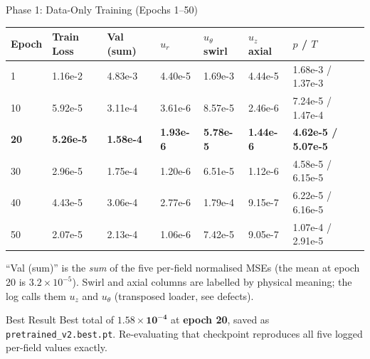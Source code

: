 \documentclass[aspectratio=169]{beamer}
\begin{document}
\begin{frame}{Phase 1: Data-Only Training (Epochs 1--50)}
\begin{table}
\centering
\footnotesize
\begin{tabular}{lllllll}
\toprule
Epoch & Train Loss & Val (sum) & $u_r$ & $u_\theta$ swirl & $u_z$ axial & $p$ / $T$ \\
\midrule
1 & 1.16e-2 & 4.83e-3 & 4.40e-5 & 1.69e-3 & 4.44e-5 & 1.68e-3 / 1.37e-3 \\
10 & 5.92e-5 & 3.11e-4 & 3.61e-6 & 8.57e-5 & 2.46e-6 & 7.24e-5 / 1.47e-4 \\
\textbf{20} & \textbf{5.26e-5} & \textbf{1.58e-4} & \textbf{1.93e-6} & \textbf{5.78e-5} & \textbf{1.44e-6} & \textbf{4.62e-5 / 5.07e-5} \\
30 & 2.96e-5 & 1.75e-4 & 1.20e-6 & 6.51e-5 & 1.12e-6 & 4.58e-5 / 6.15e-5 \\
40 & 4.43e-5 & 3.06e-4 & 2.77e-6 & 1.79e-4 & 9.15e-7 & 6.22e-5 / 6.16e-5 \\
50 & 2.07e-5 & 2.13e-4 & 1.06e-6 & 7.42e-5 & 9.05e-7 & 1.07e-4 / 2.91e-5 \\
\bottomrule
\end{tabular}
\end{table}

\small
``Val (sum)'' is the \emph{sum} of the five per-field normalised MSEs (the mean at epoch 20 is $3.2\times10^{-5}$). Swirl and axial columns are labelled by physical meaning; the log calls them $u_z$ and $u_\theta$ (transposed loader, see defects).

\begin{block}{Best Result}
Best total of $\mathbf{1.58\times10^{-4}}$ at \textbf{epoch 20}, saved as \texttt{pretrained\_v2.best.pt}. Re-evaluating that checkpoint reproduces all five logged per-field values exactly.
\end{block}
\end{frame}
\end{document}
